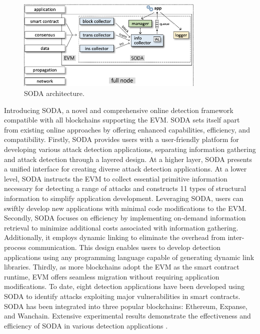 \begin{figure}[H]
 \centering
  \includegraphics[width=0.8\textwidth]{SODA Architec.png}
   \caption{SODA architecture.}
  \label{fig:SODA architecture}
\end{figure}

Introducing \ac{SODA}, a novel and comprehensive online detection framework compatible with all blockchains supporting the \ac{EVM}. \ac{SODA} sets itself apart from existing online approaches by offering enhanced capabilities, efficiency, and compatibility. Firstly, \ac{SODA} provides users with a user-friendly platform for developing various attack detection applications, separating information gathering and attack detection through a layered design. At a higher layer, \ac{SODA} presents a unified interface for creating diverse attack detection applications. At a lower level, \ac{SODA} instructs the \ac{EVM} to collect essential primitive information necessary for detecting a range of attacks and constructs 11 types of structural information to simplify application development. Leveraging \ac{SODA}, users can swiftly develop new applications with minimal code modifications to the \ac{EVM}. Secondly, \ac{SODA} focuses on efficiency by implementing on-demand information retrieval to minimize additional costs associated with information gathering. Additionally, it employs dynamic linking to eliminate the overhead from inter-process communication. This design enables users to develop detection applications using any programming language capable of generating dynamic link libraries. Thirdly, as more blockchains adopt the \ac{EVM} as the smart contract runtime, \ac{EVM} offers seamless migration without requiring application modifications. To date, eight detection applications have been developed using \ac{SODA} to identify attacks exploiting major vulnerabilities in smart contracts. \ac{SODA} has been integrated into three popular blockchains: Ethereum, Expanse, and Wanchain. Extensive experimental results demonstrate the effectiveness and efficiency of \ac{SODA} in various detection applications \cite{chen2020soda}.


